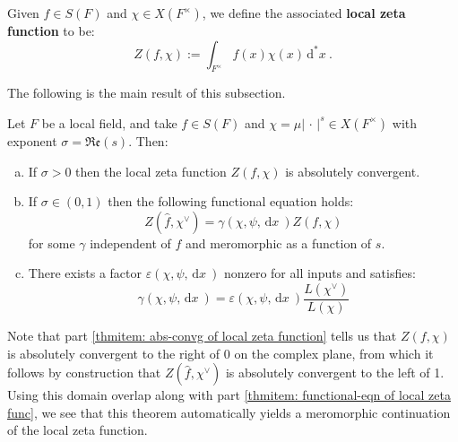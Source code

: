 \documentclass[11pt, x11names]{book}
\newcommand{\abs}[1]{\left| \, #1  \,\right|}
\renewcommand{\hat}{\widehat}
\newcommand{\re}[1]{\mathfrak{Re} \left( #1 \right)}
\newcommand{\dx}{\, \mathrm{d}x \ }
\renewcommand{\d}[1]{\, \mathrm{d}#1 \ }
\begin{document}
\begin{defn}
\label{def: local zeta function}
    Given $f \in S(F)$ and $\chi \in X(F^\times)$, we define the associated \textbf{local zeta function} to be:
    \begin{equation*}
        Z(f, \chi) := \int_{F^\times} f(x)\chi(x)\d{^*x}.
    \end{equation*} 
\end{defn}

The following is the main result of this subsection.

\begin{theorem}
\label{thm: local zeta function convergence and func-eqn}
    Let $F$ be a local field, and take  $f \in S(F)$ and $\chi = \mu \abs{\cdot}^s \in X(F^\times)$ with exponent $\sigma = \re{s}$. Then:
    \begin{enumerate}[(a)]
        \item \label{thmitem: abs-convg of local zeta function} If $\sigma > 0$ then the local zeta function $Z(f, \chi)$ is absolutely convergent.
        \item \label{thmitem: functional-eqn of local zeta func} If $\sigma \in (0, 1)$ then the following functional equation holds:
        \begin{equation*}
            Z(\hat{f}, \chi^\lor) = \gamma(\chi, \psi, \dx) Z(f, \chi)
        \end{equation*}
        for some $\gamma$ independent of $f$ and meromorphic as a function of $s$.
        \item \label{thmitem: epsilon factor local-zeta-func}There exists a factor $\varepsilon(\chi, \psi, \dx)$ nonzero for all inputs and satisfies:
        \begin{equation*}
            \gamma(\chi, \psi, \dx ) = \varepsilon(\chi, \psi, \dx) \frac{L(\chi^\lor)}{L(\chi)}
        \end{equation*}
    \end{enumerate} 
\end{theorem}

\begin{observation}
Note that part \ref{thmitem: abs-convg of local zeta function} tells us that $Z(f, \chi)$ is absolutely convergent to the right of 0 on the complex plane, from which it follows by construction that $Z(\hat{f}, \chi^\lor)$ is absolutely convergent to the left of 1. Using this domain overlap along with part \ref{thmitem: functional-eqn of local zeta func}, we see that this theorem automatically yields a meromorphic continuation of the local zeta function. 
\end{observation}
\end{document}
